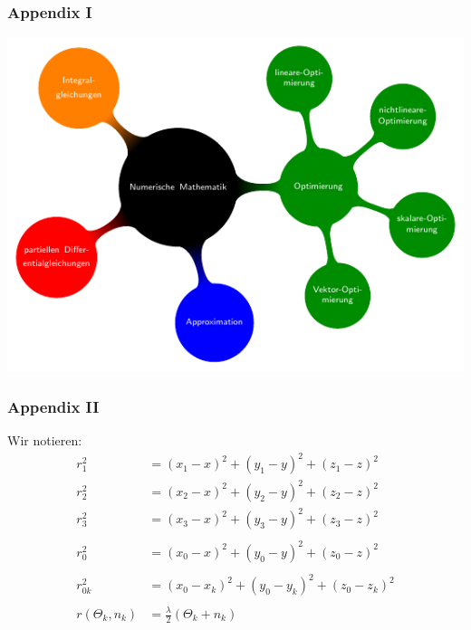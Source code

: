 
\begin{frame}[noframenumbering]
  \frametitle{Appendix I} 
	\centering
	\includegraphics[page=2, width=.6\textwidth]{../img/mindmap.pdf}
\end{frame}
\begin{frame}[noframenumbering]
  	\frametitle{Appendix II}
%  
	Wir notieren:
%	
	\begin{align}
		r_1^2&= (x_1-x )^2 + (y_1-y )^2 + (z_1-z )^2\\
		r_2^2&= (x_2-x )^2 + (y_2-y )^2 + (z_2-z )^2\\
		r_3^2&= (x_3-x )^2 + (y_3-y )^2 + (z_3-z )^2\\
		\nonumber\\
		r_0^2&= (x_0-x )^2 + (y_0-y )^2 + (z_0-z )^2\\
		\nonumber\\
		r_{0k}^2&= (x_0-x_k )^2 + (y_0-y_k )^2 + (z_0-z_k )^2 \\
		\nonumber\\
		r(\Theta_k,n_k)&=\frac{\lambda}{2}\left(\Theta_k+n_k\right)
%		
	\end{align}
%
\end{frame}
